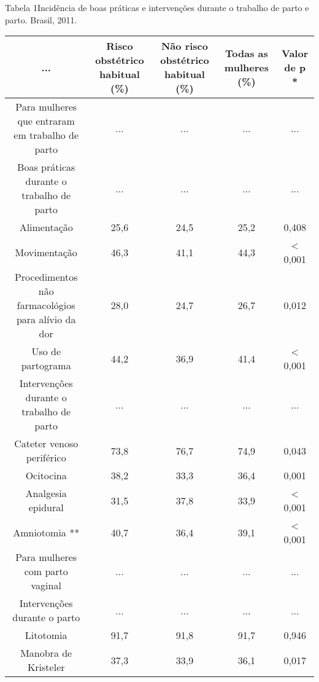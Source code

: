 \documentclass{article}
\begin{document}
Tabela 1Incidência de boas práticas e intervenções durante o trabalho de
parto e parto. Brasil, 2011.\begin{table}
\small\centering
\begin{tabulary}{\linewidth}{ C C C C C }
\hline... & Risco obstétrico habitual (\%) & Não risco obstétrico habitual (\%) &
Todas as mulheres (\%) & Valor de p *\\ \hline
Para mulheres que entraram em trabalho de parto
& ...
& ...
& ...
& ...
\\ \hline

Boas práticas durante o trabalho de parto
& ...
& ...
& ...
& ...
\\ \hline

Alimentação
& 25,6
& 24,5
& 25,2
& 0,408
\\ \hline

Movimentação
& 46,3
& 41,1
& 44,3
& < 0,001
\\ \hline

Procedimentos não farmacológios para alívio da dor
& 28,0
& 24,7
& 26,7
& 0,012
\\ \hline

Uso de partograma
& 44,2
& 36,9
& 41,4
& < 0,001
\\ \hline

Intervenções durante o trabalho de parto
& ...
& ...
& ...
& ...
\\ \hline

Cateter venoso periférico
& 73,8
& 76,7
& 74,9
& 0,043
\\ \hline

Ocitocina
& 38,2
& 33,3
& 36,4
& 0,001
\\ \hline

Analgesia epidural
& 31,5
& 37,8
& 33,9
& < 0,001
\\ \hline

Amniotomia **
& 40,7
& 36,4
& 39,1
& < 0,001
\\ \hline

Para mulheres com parto vaginal
& ...
& ...
& ...
& ...
\\ \hline

Intervenções durante o parto
& ...
& ...
& ...
& ...
\\ \hline

Litotomia
& 91,7
& 91,8
& 91,7
& 0,946
\\ \hline

Manobra de Kristeler
& 37,3
& 33,9
& 36,1
& 0,017
\\ \hline


\end{tabulary}
\end{table}
\end{document}
